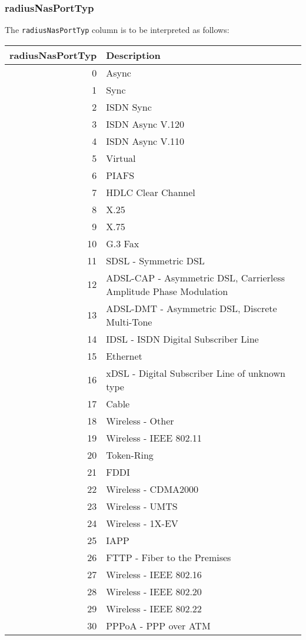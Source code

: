 \documentclass[documentation]{subfiles}
\begin{document}
\subsubsection{radiusNasPortTyp}\label{radiusNasPortTyp}
The {\tt radiusNasPortTyp} column is to be interpreted as follows:
\begin{longtable}{rl}
    \toprule
    {\bf radiusNasPortTyp} & {\bf Description}\\
    \midrule\endhead%
     0 & Async\\
     1 & Sync\\
     2 & ISDN Sync\\
     3 & ISDN Async V.120\\
     4 & ISDN Async V.110\\
     5 & Virtual\\
     6 & PIAFS\\
     7 & HDLC Clear Channel\\
     8 & X.25\\
     9 & X.75\\
    10 & G.3 Fax\\
    11 & SDSL - Symmetric DSL\\
    12 & ADSL-CAP - Asymmetric DSL, Carrierless Amplitude Phase Modulation\\
    13 & ADSL-DMT - Asymmetric DSL, Discrete Multi-Tone\\
    14 & IDSL - ISDN Digital Subscriber Line\\
    15 & Ethernet\\
    16 & xDSL - Digital Subscriber Line of unknown type\\
    17 & Cable\\
    18 & Wireless - Other\\
    19 & Wireless - IEEE 802.11\\
    20 & Token-Ring\\
    21 & FDDI\\
    22 & Wireless - CDMA2000\\
    23 & Wireless - UMTS\\
    24 & Wireless - 1X-EV\\
    25 & IAPP\\
    26 & FTTP - Fiber to the Premises\\
    27 & Wireless - IEEE 802.16\\
    28 & Wireless - IEEE 802.20\\
    29 & Wireless - IEEE 802.22\\
    30 & PPPoA - PPP over ATM\\

\end{longtable}
\end{document}
